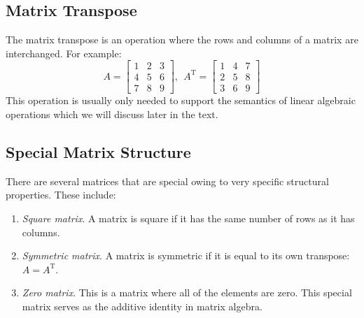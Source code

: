 \subsection{Matrix Transpose}
The matrix transpose is an operation where the rows and columns of a matrix are interchanged.  For example:
\begin{equation*}A = 
\left[
\begin{matrix}
1 & 2 & 3 \\
4 & 5 & 6 \\
7 & 8 & 9
\end{matrix}
\right], \ \ 
A^{\text{T}} = 
\left[
\begin{matrix}
1 & 4 & 7 \\
2 & 5 & 8 \\
3 & 6 & 9
\end{matrix}
\right]
\end{equation*}
This operation is usually only needed to support the semantics of linear algebraic operations which we will discuss later in the text.

\subsection{Special Matrix Structure}
There are several matrices that are special owing to very specific structural properties.  These include:
\begin{enumerate}
\item \emph{Square matrix}.  A matrix is square if it has the same number of rows as it has columns.

\item \emph{Symmetric matrix}. A matrix is symmetric if it is equal to its own transpose: $A = A^{\text{T}}$.

\item \emph{Zero matrix}. This is a matrix where all of the elements are zero.  This special matrix serves as the additive identity in matrix algebra.

\end{enumerate}

